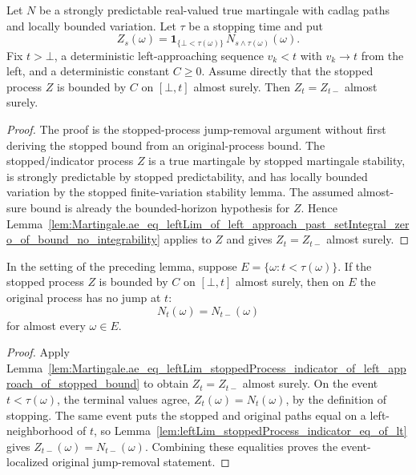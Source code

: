 \begin{lemma}\label{lem:Martingale.ae_eq_leftLim_stoppedProcess_indicator_of_left_approach_of_stopped_bound}
Let \(N\) be a strongly predictable real-valued true martingale with cadlag
paths and locally bounded variation.  Let \(\tau\) be a stopping time and put
\[
  Z_s(\omega)=
  \mathbf 1_{\{\bot<\tau(\omega)\}}\,
  N_{s\wedge\tau(\omega)}(\omega).
\]
Fix \(t>\bot\), a deterministic left-approaching sequence \(v_k<t\) with
\(v_k\to t\) from the left, and a deterministic constant \(C\ge 0\).  Assume
directly that the stopped process \(Z\) is bounded by \(C\) on
\([\bot,t]\) almost surely.  Then \(Z_t=Z_{t-}\) almost surely.
\end{lemma}

\begin{proof}
The proof is the stopped-process jump-removal argument without first deriving
the stopped bound from an original-process bound.  The stopped/indicator
process \(Z\) is a true martingale by stopped martingale stability, is
strongly predictable by stopped predictability, and has locally bounded
variation by the stopped finite-variation stability lemma.  The assumed
almost-sure bound is already the bounded-horizon hypothesis for \(Z\).  Hence
Lemma~\ref{lem:Martingale.ae_eq_leftLim_of_left_approach_past_setIntegral_zero_of_bound_no_integrability}
applies to \(Z\) and gives \(Z_t=Z_{t-}\) almost surely.
\end{proof}

\begin{lemma}\label{lem:Martingale.ae_eq_leftLim_on_event_of_left_approach_of_stopped_bound}
In the setting of the preceding lemma, suppose \(E=\{\omega:t<\tau(\omega)\}\).
If the stopped process \(Z\) is bounded by \(C\) on \([\bot,t]\) almost
surely, then on \(E\) the original process has no jump at \(t\):
\[
  N_t(\omega)=N_{t-}(\omega)
\]
for almost every \(\omega\in E\).
\end{lemma}

\begin{proof}
Apply
Lemma~\ref{lem:Martingale.ae_eq_leftLim_stoppedProcess_indicator_of_left_approach_of_stopped_bound}
to obtain \(Z_t=Z_{t-}\) almost surely.  On the event \(t<\tau(\omega)\),
the terminal values agree, \(Z_t(\omega)=N_t(\omega)\), by the definition of
stopping.  The same event puts the stopped and original paths equal on a
left-neighborhood of \(t\), so
Lemma~\ref{lem:leftLim_stoppedProcess_indicator_eq_of_lt} gives
\(Z_{t-}(\omega)=N_{t-}(\omega)\).  Combining these equalities proves the
event-localized original jump-removal statement.
\end{proof}

